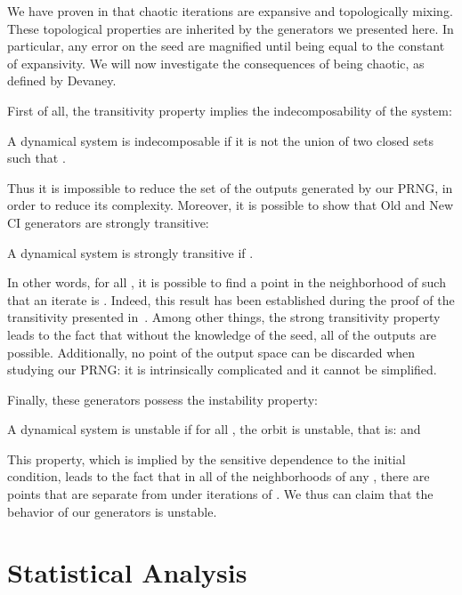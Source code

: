 \documentclass[journal]{IEEEtran}
\begin{document}
We have proven in \cite{gfb10:ip} that chaotic iterations are expansive and topologically mixing. These topological properties are inherited by the generators we presented here. In particular, any error on the seed are magnified until being equal to the constant of expansivity.
We will now investigate the consequences of being chaotic, as defined by Devaney. 

First of all, the transitivity property implies the indecomposability of the system:

\begin{definition}
A dynamical system  is indecomposable if it is not the union of two closed sets  such that .
\end{definition}

Thus it is impossible to reduce the set of the outputs generated by our PRNG, in order to reduce its complexity. Moreover, it is possible to show that Old and New CI generators are strongly transitive:

\begin{definition}
A dynamical system  is strongly transitive if      .
\end{definition}

In other words, for all , it is possible to find a point  in the neighborhood of  such that an iterate  is . Indeed, this result has been established during the proof of the transitivity presented in~\cite{guyeux09}. Among other things, the strong transitivity property leads to the fact that without the knowledge of the seed, all of the outputs are possible. Additionally, no point of the output space can be discarded when studying our PRNG: it is intrinsically complicated and it cannot be simplified.

Finally, these generators possess the instability property:

\begin{definition}
A dynamical system  is unstable if for all , the orbit  is unstable, that is:      and 
\end{definition}

This property, which is implied by the sensitive dependence to the initial condition, leads to the fact that in all of the neighborhoods of any , there are points that are separate from  under iterations of . We thus can claim that the behavior of our generators is unstable.

\section{Statistical Analysis}
\label{Comparative analysis}
\end{document}

